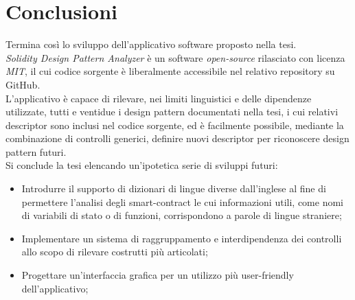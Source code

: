\chapter{Conclusioni}
Termina così lo sviluppo dell'applicativo software proposto nella tesi.\\
\newline
\textit{Solidity Design Pattern Analyzer} è un software \textit{open-source} rilasciato con licenza \textit{MIT}, il cui codice sorgente è liberalmente accessibile nel relativo repository su GitHub\cite{github-repo}.\\
\newline
L'applicativo è capace di rilevare, nei limiti linguistici e delle dipendenze utilizzate, tutti e ventidue i design pattern documentati nella tesi, i cui relativi descriptor sono inclusi nel codice sorgente, ed è facilmente possibile, mediante la combinazione di controlli generici, definire nuovi descriptor per riconoscere design pattern futuri.\\
\newline
Si conclude la tesi elencando un'ipotetica serie di sviluppi futuri:
\begin{itemize}
	\item Introdurre il supporto di dizionari di lingue diverse dall'inglese al fine di permettere l'analisi degli smart-contract le cui informazioni utili, come nomi di variabili di stato o di funzioni, corrispondono a parole di lingue straniere;
	\item Implementare un sistema di raggruppamento e interdipendenza dei controlli allo scopo di rilevare costrutti più articolati;
	\item Progettare un'interfaccia grafica per un utilizzo più user-friendly dell'applicativo;
\end{itemize}
 
 
